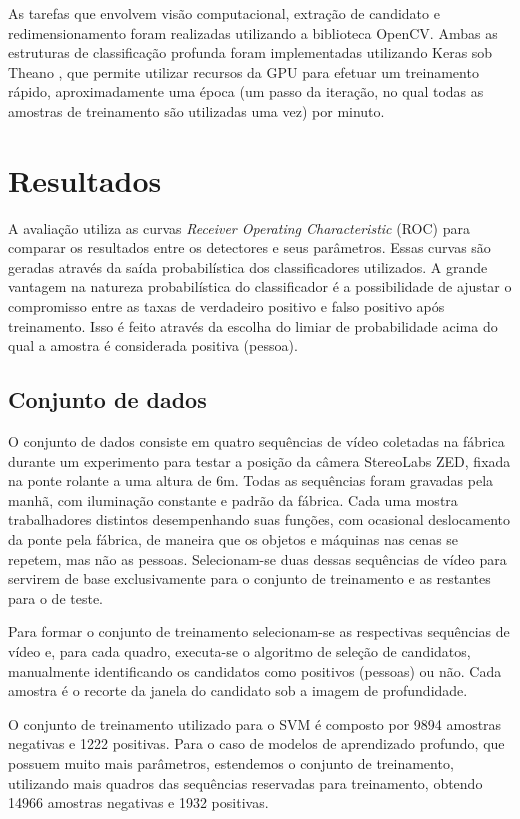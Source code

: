         As tarefas que envolvem visão computacional, extração de candidato e redimensionamento foram realizadas utilizando a biblioteca OpenCV. Ambas as estruturas de classificação profunda foram implementadas utilizando Keras \cite{keras} sob Theano \cite{theano}, que permite utilizar recursos da GPU para efetuar um treinamento rápido, aproximadamente uma época (um passo da iteração, no qual todas as amostras de treinamento são utilizadas uma vez) por minuto.

\section{Resultados}
\label{sec:results}

    A avaliação utiliza as curvas \textit{Receiver Operating Characteristic} (ROC) \cite{evaluationMetrics} para comparar os resultados entre os detectores e seus parâmetros. Essas curvas são geradas através da saída probabilística dos classificadores utilizados. A grande vantagem na natureza probabilística do classificador é a possibilidade de ajustar o compromisso entre as taxas de verdadeiro positivo e falso positivo após treinamento. Isso é feito através da escolha do limiar de probabilidade acima do qual a amostra é considerada positiva (pessoa).

\subsection{Conjunto de dados}
    O conjunto de dados consiste em quatro sequências de vídeo coletadas na fábrica durante um experimento para testar a posição da câmera StereoLabs ZED, fixada na ponte rolante a uma altura de 6m. Todas as sequências foram gravadas pela manhã, com iluminação constante e padrão da fábrica. Cada uma mostra trabalhadores distintos desempenhando suas funções, com ocasional deslocamento da ponte pela fábrica, de maneira que os objetos e máquinas nas cenas se repetem, mas não as pessoas. Selecionam-se duas dessas sequências de vídeo para servirem de base exclusivamente para o conjunto de treinamento e as restantes para o de teste.

    Para formar o conjunto de treinamento selecionam-se as respectivas sequências de vídeo e, para cada quadro, executa-se o algoritmo de seleção de candidatos, manualmente identificando os candidatos como positivos (pessoas) ou não.  Cada amostra é o recorte da janela do candidato sob a imagem de profundidade.

    O conjunto de treinamento utilizado para o SVM é composto por 9894 amostras negativas e 1222 positivas. Para o caso de modelos de aprendizado profundo, que possuem muito mais parâmetros, estendemos o conjunto de treinamento, utilizando mais quadros das sequências reservadas para treinamento, obtendo 14966 amostras negativas e 1932 positivas.

